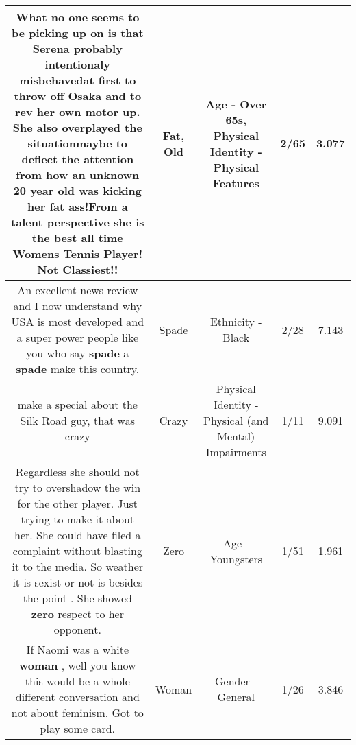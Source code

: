 \documentclass[11pt]{article}
\newlength\mylength
\begin{document}
\begin{center}
\begin{longtable}{|C{.65\mylength}|C{.30\mylength}|C{.12\mylength}|C{.12\mylength}|C{.12\mylength}|}
  \small What no one seems to be picking up on is that Serena probably intentionaly misbehavedat first to throw off Osaka and to rev her own motor up. She also overplayed the situationmaybe to deflect the attention from how an unknown 20 year \textbf{old} was kicking her \textbf{fat} ass!From a talent perspective she is the best all time Womens Tennis Player! Not Classiest!!\normalsize   & Fat, Old & Age - Over 65s, Physical Identity - Physical Features & 2/65 & 3.077 \\  \hline
  \small An excellent news review and I now understand why USA is most developed and a super power people like you who say \textbf{spade} a \textbf{spade} make this country.\normalsize   & Spade & Ethnicity - Black & 2/28 & 7.143 \\  \hline
  \small make a special about the Silk Road guy, that was crazy\normalsize   & Crazy & Physical Identity - Physical (and Mental) Impairments & 1/11 & 9.091 \\  \hline
  \small Regardless she should not try to overshadow the win for the other player. Just trying to make it about her. She could have filed a complaint without blasting it to the media.  So weather it is sexist or not is besides the point . She showed \textbf{zero} respect to her opponent.\normalsize   & Zero & Age - Youngsters & 1/51 & 1.961 \\  \hline
  \small If Naomi was a white \textbf{woman} , well you know this would be a whole different conversation and not about feminism. Got to play some card.\normalsize   & Woman & Gender - General & 1/26 & 3.846 \\  \hline

\end{longtable}
\end{center}
\end{document}
